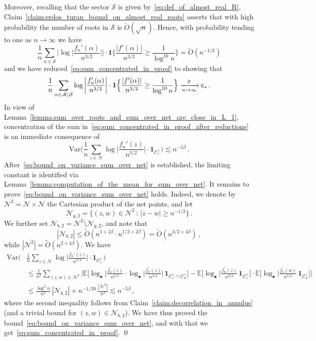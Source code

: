 \documentclass[11pt]{amsart}
\theoremstyle{remark}
\theoremstyle{definition}
\newcommand{\bP}{\mathbb P}
\newcommand{\bE}{\mathbb E}
\newcommand{\cA}{\mathcal A}
\newcommand{\cC}{\mathcal C}
\newcommand{\cN}{\mathcal N}
\newcommand{\one}{\boldsymbol{1}}
\begin{document}
    Moreover, recalling that the sector $\mathcal{S}$ is given by~\eqref{eq:def_of_almost_real_R}, Claim~\ref{claim:erdos_turan_bound_on_almost_real_roots} asserts that with high probability the number of roots in $\mathcal{S}$ is $\widetilde{O}(\sqrt{n})$. Hence, with probability tending to one as $n\to\infty$ we have
    \[
    \frac{1}{n} \sum_{\alpha\in \mathcal{S}} \bigg| \log \Big|\frac{f_n'(\alpha)}{n^{3/2}} \Big| \bigg| \cdot \one\Big\{\frac{|f'(\alpha)|}{n^{3/2}} \ge \frac{1}{\log^{10} n} \Big\} =  \widetilde{O}(n^{-1/2})
    \]
    and we have reduced~\eqref{eq:sum_concentrated_in_proof} to showing that
    \begin{equation}
    \label{eq:sum_concentrated_in_proof_after_reductions}
           \frac{1}{n} \sum_{\alpha\in \cA\setminus \mathcal{S}} \log \left|\frac{f_n'(\alpha)}{n^{3/2}} \right| \cdot \one\Big\{\frac{|f'(\alpha)|}{n^{3/2}} \ge \frac{1}{\log^{10} n} \Big\}   \xrightarrow[n\to \infty]{\bP} {\sf c}_\ast \, .
    \end{equation}
    In view of Lemma~\ref{lemma:sum_over_roots_and_sum_over_net_are_close_in_L_1}, concentration of the sum in~\eqref{eq:sum_concentrated_in_proof_after_reductions} is an immediate consequence of
    \begin{equation}
        \label{eq:bound_on_variance_sum_over_net}
        \text{Var}\bigg( \frac{1}{n} \sum_{z \in \cN} \log \Big|\frac{f_n'(z)}{n^{3/2}} \Big| \cdot \one_{\cC_z^+} \bigg) \lesssim n^{-5\beta} \, .
    \end{equation}
    After~\eqref{eq:bound_on_variance_sum_over_net} is established, the limiting constant is identified via Lemma~\ref{lemma:computation_of_the_mean_for_sum_over_net}. It remains to prove~\eqref{eq:bound_on_variance_sum_over_net} holds. Indeed, we denote by $\cN^2 = \cN\times \cN$ the Cartesian product of the net points, and let 
    \[
    \cN_{g,2} = \Big\{(z,w) \in \cN^2 \, : \,  |z-w| \ge n^{-1/2} \Big\} \, .
    \]
    We further set $\cN_{b,2} = \cN^2 \setminus \cN_{g,2}$, and note that $$|\cN_{b,2}| \le  \widetilde{O}(n^{1+2\beta} \cdot n^{1/2 + 2\beta}) = \widetilde{O}(n^{3/2 + 4\beta}) \, ,$$
    while $|\cN^2| = \widetilde{O}(n^{2+4\beta})$. We have
    \begin{align*}
        \text{Var}\bigg( &\frac{1}{n} \sum_{z \in \cN} \log \Big|\frac{f_n'(z)}{n^{3/2}} \Big| \cdot \one_{\cC_z^+} \bigg) \\ &\le \frac{1}{n^2} \sum_{(z,w)\in \cN^2} \bigg|\bE\Big[ \log_\bullet\Big|\frac{f_n^\prime(z)}{n^{3/2}} \cdot \log_\bullet\Big|\frac{f_n^\prime(z)}{n^{3/2}} \Big| \, \one_{\cC_z^+\cap\cC_w^+} \Big] - \bE\Big[ \log_\bullet\Big|\frac{f_n^\prime(z)}{n^{3/2}} \, \one_{\cC_z^+} \Big] \cdot \bE\big[ \log_\bullet\Big|\frac{f_n^\prime(w)}{n^{3/2}} \, \one_{\cC_w^+} \Big]\bigg| \\ &\le \frac{\log^2 n}{n^2} \, |\cN_{b,2}| + n^{-1/20} \, \frac{|\cN^2|}{n^2} \lesssim n^{-5\beta} \, ,
    \end{align*}
    where the second inequality follows from Claim~\ref{claim:decorrelation_in_annulus} (and a trivial bound for $(z,w)\in \cN_{b,2}$). We have thus proved the bound~\eqref{eq:bound_on_variance_sum_over_net}, and with that we get~\eqref{eq:sum_concentrated_in_proof}.  
    \qed
    
\end{document}
